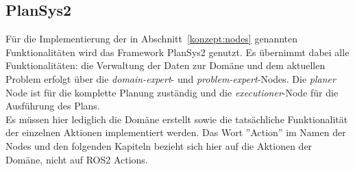 \subsection{PlanSys2}
Für die Implementierung der in Abschnitt~\ref{konzept:nodes} genannten Funktionalitäten wird das Framework \ac{PlanSys2} genutzt.
Es übernimmt dabei alle Funktionalitäten: die Verwaltung der Daten zur Domäne und dem aktuellen Problem erfolgt über die \emph{domain-expert}- und \emph{problem-expert}-Nodes.
Die \emph{planer} Node ist für die komplette Planung zuständig und die \emph{executioner}-Node für die Ausführung des Plans.\\
Es müssen hier lediglich die Domäne erstellt sowie die tatsächliche Funktionalität der einzelnen Aktionen implementiert werden.
Das Wort ''Action'' im Namen der Nodes und den folgenden Kapiteln bezieht sich hier auf die Aktionen der Domäne, nicht auf \ac{ROS2} Actions.


